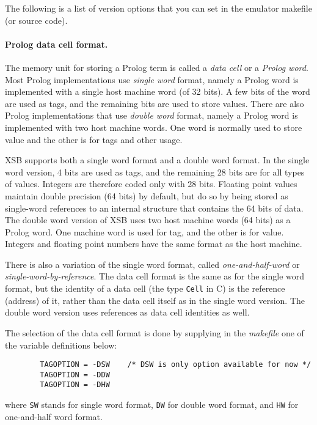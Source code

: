 \documentclass[11pt]{article}
\begin{document}
The following is a list of version options that you can set in the
emulator makefile (or source code).

\paragraph{Prolog data cell format. }
The memory unit for storing a Prolog term is called a {\it
data cell} or a {\it Prolog word}. Most Prolog implementations
use {\it single word} format, namely a Prolog word is implemented
with a single host machine word (of 32 bits). A few bits
of the word are used as tags, and the remaining bits are used
to store values. There are also Prolog implementations that use
{\it double word} format, namely a Prolog word is implemented
with two host machine words. One word is normally used to store 
value and the other is for tags and other usage.

XSB supports both a single word format and a double word
format.  In the single word version, 4 bits are used as tags, and the
remaining 28 bits are for all types of values. Integers are therefore coded only 
with 28 bits. Floating point values maintain double precision (64 bits) by default, 
but do so by being stored as single-word references to an internal structure that
contains the 64 bits of data. The double word version of XSB uses two host machine 
words (64 bits) as a Prolog word. One machine word is used for tag, and the other 
is for value. Integers and floating point numbers have the same format as the host
machine.

There is also a variation of the single word format, called {\it
one-and-half-word} or {\it single-word-by-reference}. 
The data cell format is the same as for the single word format,
but the identity of a data cell (the type {\tt Cell} in C) is the
reference (address) of it, rather than the data cell itself as in
the single word version. The double word version uses references
as data cell identities as well.

The selection of the data cell format is done by supplying 
in the {\it makefile} one of the variable definitions below:

\begin{verbatim}
        TAGOPTION = -DSW 	/* DSW is only option available for now */
        TAGOPTION = -DDW
        TAGOPTION = -DHW
\end{verbatim}

where {\tt SW} stands for single word format, {\tt DW} for double word
format, and {\tt HW} for one-and-half word format.
\end{document}
